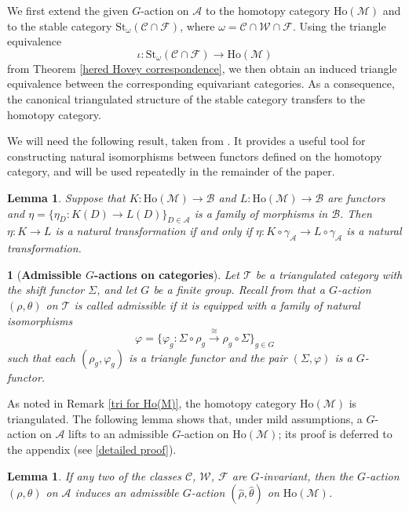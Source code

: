 \documentclass[12pt,twoside]{amsart}
\theoremstyle{bfupright head,slanted body}
\theoremstyle{bfupright head,upright body}
\newtheorem{bfhpg}[res]{}               \newtheorem*{bfhpg*}{}
\theoremstyle{fixed bf head,slanted body}
\newtheorem{lem}[res]{Lemma}            \newtheorem*{lem*}{Lemma}
\theoremstyle{fixed bf head,upright body}
\theoremstyle{numbered paragraph}
\newcommand{\corcite}[2][?]{\cite[Corollary~#1]{#2}}
\newcommand{\dfncite}[2][?]{\cite[Definition~#1]{#2}}
\numberwithin{equation}{res}
\newcommand{\calC}{\mathcal{C}}
\newcommand{\calW}{\mathcal{W}}
\newcommand{\calF}{\mathcal{F}}
\newcommand{\calA}{\mathcal{A}}
\newcommand{\calB}{\mathcal{B}}
\newcommand{\calM}{\mathcal{M}}
\newcommand{\calT}{\mathcal{T}}
\newcommand{\Ho}{\mathrm{Ho}}
\newcommand{\St}{\mathrm{St}}
\begin{document}
We first extend the given \(G\)-action on \(\calA\) to the homotopy category \(\Ho(\calM)\) and to the stable category \(\St_\omega(\calC\cap\calF)\), where \(\omega = \calC\cap\calW\cap\calF\).
Using the triangle equivalence
\[
\iota : \St_\omega(\calC \cap \calF) \longrightarrow \Ho(\calM)
\]
from Theorem \ref{hered Hovey correspondence}, we then obtain an induced triangle equivalence between the corresponding equivariant categories.
As a consequence, the canonical triangulated structure of the stable category transfers to the homotopy category.

We will need the following result, taken from \corcite[5.16]{2025GillBook}. It provides a useful tool for constructing natural isomorphisms between functors defined on the homotopy category, and will be used repeatedly in the remainder of the paper.

\begin{lem} \label{natural iso}
Suppose that $K : \Ho(\calM) \to \calB$ and $L : \Ho(\calM) \to \calB$ are functors and $\eta = \{ \eta_D : K(D) \to L(D) \}_{D \in \calA}$ is a family of morphisms in $\calB$.
Then $\eta : K \to L$ is a natural transformation if and only if $\eta : K \circ \gamma_{\calA} \to L \circ \gamma_{\calA}$ is a natural transformation.
\end{lem}

\begin{bfhpg}[\bf Admissible \(G\)-actions on categories]\label{admiss GrAct on Cat}
Let \(\calT\) be a triangulated category with the shift functor \(\mathsf{\Sigma}\), and let \(G\) be a finite group.
Recall from \dfncite[3.1]{2019Sun} that a \(G\)-action \((\rho,\theta)\) on \(\calT\) is called \emph{admissible} if it is equipped with a family of natural isomorphisms
\[
\varphi = \{\varphi_g : \mathsf{\Sigma} \circ \rho_g \overset{\cong}{\longrightarrow} \rho_g \circ \mathsf{\Sigma}\}_{g \in G}
\]
such that each \((\rho_g,\varphi_g)\) is a triangle functor and the pair \((\mathsf{\Sigma},\varphi)\) is a \(G\)-functor.
\end{bfhpg}

As noted in Remark \ref{tri for Ho(M)}, the homotopy category \(\Ho(\calM)\) is triangulated. The following lemma shows that, under mild assumptions, a \(G\)-action on \(\calA\) lifts to an admissible \(G\)-action on \(\Ho(\calM)\); its proof is deferred to the appendix (see \ref{detailed proof}).

\begin{lem} \label{admiss for Ho(M)}
If any two of the classes \(\calC\), \(\calW\), \(\calF\) are \(G\)-invariant, then the \(G\)-action \((\rho,\theta)\) on \(\calA\) induces an admissible \(G\)-action \((\widehat{\rho},\widehat{\theta})\) on \(\Ho(\calM)\).
\end{lem}
\end{document}
